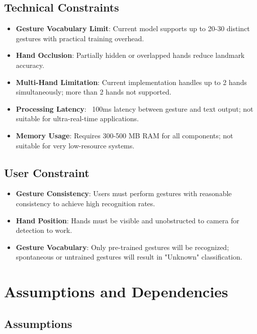 \subsection{Technical Constraints}

\begin{itemize}
    \item \textbf{Gesture Vocabulary Limit}: Current model supports up to 20-30 distinct gestures with practical training overhead.
    \item \textbf{Hand Occlusion}: Partially hidden or overlapped hands reduce landmark accuracy.
    \item \textbf{Multi-Hand Limitation}: Current implementation handles up to 2 hands simultaneously; more than 2 hands not supported.
    \item \textbf{Processing Latency}: ~100ms latency between gesture and text output; not suitable for ultra-real-time applications.
    \item \textbf{Memory Usage}: Requires 300-500 MB RAM for all components; not suitable for very low-resource systems.
\end{itemize}

\subsection{User Constraint}

\begin{itemize}
    \item \textbf{Gesture Consistency}: Users must perform gestures with reasonable consistency to achieve high recognition rates.
    \item \textbf{Hand Position}: Hands must be visible and unobstructed to camera for detection to work.
    \item \textbf{Gesture Vocabulary}: Only pre-trained gestures will be recognized; spontaneous or untrained gestures will result in "Unknown" classification.
\end{itemize}

\section{Assumptions and Dependencies}

\subsection{Assumptions}

